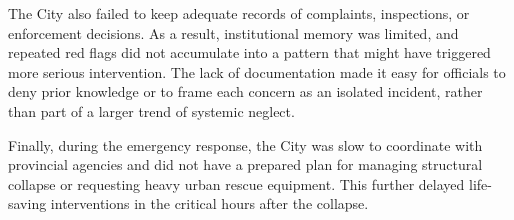 \documentclass[12pt]{article}
\begin{document}
The City also failed to keep adequate records of complaints, inspections, or enforcement decisions. As a result, institutional memory was limited, and repeated red flags did not accumulate into a pattern that might have triggered more serious intervention. The lack of documentation made it easy for officials to deny prior knowledge or to frame each concern as an isolated incident, rather than part of a larger trend of systemic neglect.

Finally, during the emergency response, the City was slow to coordinate with provincial agencies and did not have a prepared plan for managing structural collapse or requesting heavy urban rescue equipment. This further delayed life-saving interventions in the critical hours after the collapse.


\end{document}
